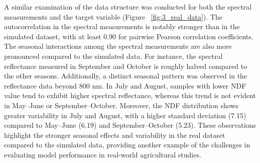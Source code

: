 A similar examination of the data structure was conducted for both the spectral measurements and the target variable (Figure ~\ref{fig:3_real_data}). The autocorrelation in the spectral measurements is notably stronger than in the simulated dataset, with at least 0.90 for pairwise Pearson correlation coefficients. The seasonal interactions among the spectral measurements are also more pronounced compared to the simulated data. For instance, the spectral reflectance measured in September and October is roughly halved compared to the other seasons. Additionally, a distinct seasonal pattern was observed in the reflectance data beyond 800 nm. In July and August, samples with lower NDF value tend to exhibit higher spectral reflectance, whereas this trend is not evident in May–June or September–October. Moreover, the NDF distribution shows greater variability in July and August, with a higher standard deviation (7.15) compared to May–June (6.19) and September–October (5.23). These observations highlight the stronger seasonal effects and variability in the real dataset compared to the simulated data, providing another example of the challenges in evaluating model performance in real-world agricultural studies.